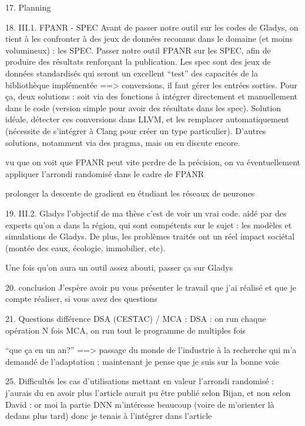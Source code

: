 \documentclass[a4paper,11pt]{report}
\begin{document}
17. Planning

18. III.1. FPANR - SPEC
Avant de passer notre outil sur les codes de Gladys, on tient à les confronter à des jeux de données reconnus dans le domaine (et moins volumineux) : les SPEC.
Passer notre outil FPANR sur les SPEC, afin de produire des résultats renforçant  la publication. Les spec sont des jeux de données standardisés qui seront un excellent “test” des capacités de la bibliothèque implémentée
==> conversions, il faut gérer les entrées sorties. Pour ça, deux solutions : soit via des fonctions à intégrer directement et manuellement dans le code (version simple pour avoir des résultats dans les spec). Solution idéale, détecter ces conversions dans LLVM, et les remplacer automatiquement (nécessite de s’intégrer à Clang pour créer un type particulier). D’autres solutions, notamment via des pragma, mais on en discute encore.

vu que on voit que FPANR peut vite perdre de la précision, on va éventuellement appliquer l’arrondi randomisé dans le cadre de FPANR

prolonger la descente de gradient en étudiant les réseaux de neurones


19. III.2. Gladys
l’objectif de ma thèse c’est de voir un vrai code. aidé par des experts qu’on a dans la région, qui sont compétents sur le sujet : les modèles et simulations de Gladys.
De plus, les problèmes traités ont un réel impact sociétal (montée des eaux, écologie, immobilier, etc).

Une fois qu’on aura un outil assez abouti, passer ça sur Gladys

20. conclusion
J’espère avoir pu vous présenter le travail que j’ai réalisé et que je compte réaliser, si vous avez des questions

21. Questions
différence DSA (CESTAC) / MCA :
DSA : on run chaque opération N fois
MCA, on run tout le programme de multiples fois

“que ça en un an?”
==> passage du monde de l’industrie à la recherche qui m’a demandé de l’adaptation ; maintenant je pense que je suis sur la bonne voie

25. Difficultés
les cas d’utilisations mettant en valeur l’arrondi randomisé : j’aurais du en avoir plus
l’article aurait pu être publié selon Bijan, et non selon David : or moi la partie DNN m’intéresse beaucoup (voire de m’orienter là dedans plus tard) donc je tenais à l’intégrer dans l’article
\end{document}

